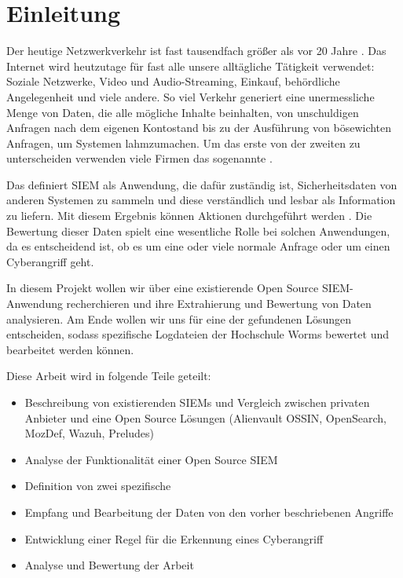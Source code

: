 \section{Einleitung}

Der heutige Netzwerkverkehr ist fast tausendfach größer als vor 20 Jahre \citep{Roser_I}. Das Internet wird heutzutage für fast alle unsere alltägliche Tätigkeit verwendet: Soziale Netzwerke, Video und Audio-Streaming, Einkauf, behördliche Angelegenheit und viele andere. So viel Verkehr generiert eine unermessliche Menge von Daten, die alle mögliche Inhalte beinhalten, von unschuldigen Anfragen nach dem eigenen Kontostand bis zu der Ausführung von bösewichten Anfragen, um Systemen lahmzumachen. Um das erste von der zweiten zu unterscheiden verwenden viele Firmen das sogenannte .

Das  definiert \acrshort{SIEM} als Anwendung, die dafür zuständig ist, Sicherheitsdaten von anderen Systemen zu sammeln und diese verständlich und lesbar als Information zu liefern. Mit diesem Ergebnis können Aktionen durchgeführt werden \citep{NIST_SIEM}. Die Bewertung dieser Daten spielt eine wesentliche Rolle bei solchen Anwendungen, da es entscheidend ist, ob es um eine oder viele normale Anfrage oder um einen \gls{Cyberangriff} geht.

In diesem Projekt wollen wir über eine existierende \gls{Open Source} \gls{SIEM}-Anwendung recherchieren und ihre Extrahierung und Bewertung von Daten analysieren. Am Ende wollen wir uns für eine der gefundenen Lösungen entscheiden, sodass spezifische Logdateien der Hochschule Worms bewertet und bearbeitet werden können.

Diese Arbeit wird in folgende Teile geteilt:





\begin{itemize}[noitemsep]
   \item Beschreibung von existierenden \glspl{SIEM} und Vergleich zwischen privaten Anbieter und eine \gls{Open Source} Lösungen (Alienvault OSSIN, OpenSearch, MozDef, Wazuh, Preludes)
   \item Analyse der Funktionalität einer \gls{Open Source} \gls{SIEM}
   \item Definition von zwei spezifische 
   \item Empfang und Bearbeitung der Daten von den vorher beschriebenen Angriffe
   \item Entwicklung einer Regel für die Erkennung eines \gls{Cyberangriff}
   \item Analyse und Bewertung der Arbeit
\end{itemize}

